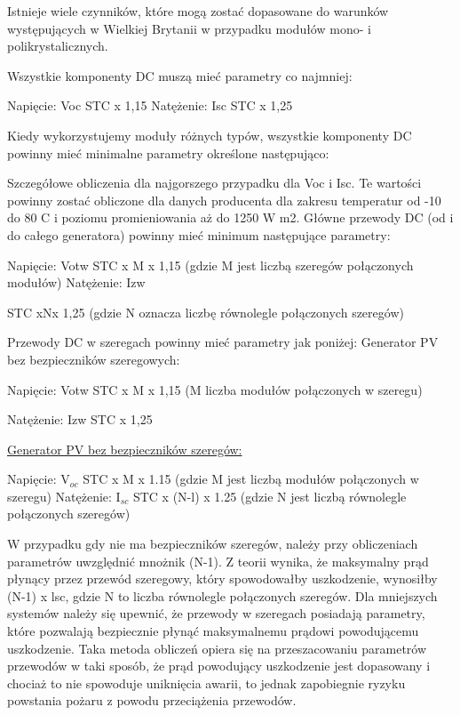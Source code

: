 \documentclass[12pt,a4paper]{article}
\begin{document}
Istnieje wiele czynników, które mogą zostać dopasowane do warunków 
występujących w Wielkiej Brytanii w przypadku modułów mono- i 
polikrystalicznych. 

Wszystkie komponenty DC muszą mieć parametry co najmniej: 

Napięcie: Voc STC x 1,15 Natężenie: Isc STC x 1,25 

Kiedy wykorzystujemy moduły różnych typów, wszystkie komponenty DC 
powinny mieć minimalne parametry określone następująco: 

Szczegółowe obliczenia dla najgorszego przypadku dla Voc i Isc. Te 
wartości powinny zostać 
obliczone dla danych producenta 
dla zakresu temperatur od -10 do 
80 \degree C i poziomu promieniowania 
aż do 1250 W  m2. 
Główne przewody DC (od i do całego generatora) powinny mieć minimum 
następujące parametry: 

Napięcie: Votw STC x M x 1,15 (gdzie M jest liczbą szeregów połączonych 
modułów) Natężenie: Izw 

STC xNx 1,25 (gdzie N oznacza liczbę równolegle połączonych szeregów) 

Przewody DC w szeregach powinny mieć parametry jak poniżej: Generator PV 
bez bezpieczników szeregowych: 

 

Napięcie: Votw STC x M x 1,15 (M liczba modułów połączonych w szeregu) 

Natężenie: Izw STC x 1,25 

\underline{Generator PV bez bezpieczników szeregów:} 

Napięcie: V$_{oc}$ STC x M x 1.15 (gdzie M jest liczbą modułów 
połączonych w szeregu) Natężenie: I$_{sc}$ STC x (N-l) x 1.25 (gdzie 
N jest liczbą równolegle połączonych szeregów) 

W przypadku gdy nie ma bezpieczników szeregów, należy przy obliczeniach 
parametrów uwzględnić mnożnik (N-1). Z teorii wynika, że maksymalny prąd 
płynący przez przewód szeregowy, który spowodowałby uszkodzenie, 
wynosiłby (N-1) x lsc, gdzie N to liczba równolegle połączonych 
szeregów. Dla mniejszych systemów należy się upewnić, że przewody w 
szeregach posiadają parametry, które pozwalają bezpiecznie płynąć 
maksymalnemu prądowi powodującemu uszkodzenie. Taka metoda obliczeń 
opiera się na przeszacowaniu parametrów przewodów w taki sposób, że prąd 
powodujący uszkodzenie jest dopasowany i chociaż to nie spowoduje 
uniknięcia awarii, to jednak zapobiegnie ryzyku powstania pożaru z 
powodu przeciążenia przewodów. 
\end{document}
